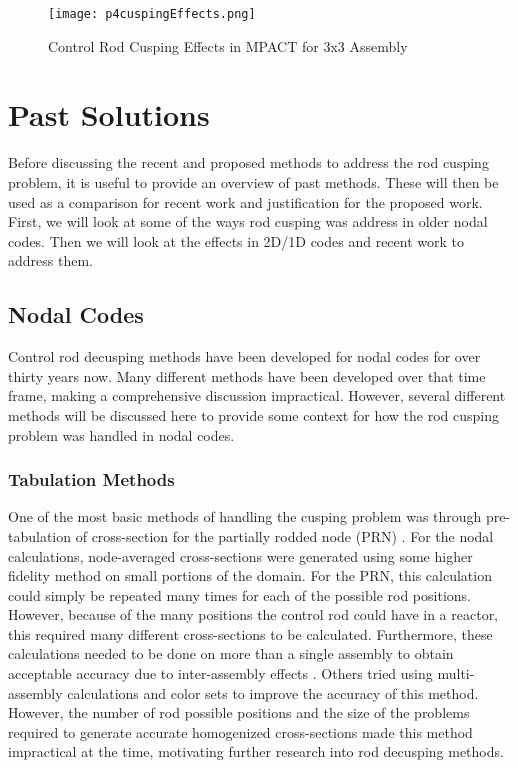 \begin{figure}
    \centering
    \texttt{[image: p4cuspingEffects.png]}
    \caption[Rod Cusping in MPACT]{Control Rod Cusping Effects in MPACT for 3x3 Assembly}\label{f:p4cuspingEffects}
\end{figure}

\section{Past Solutions}

Before discussing the recent and proposed methods to address the rod cusping problem, it is useful to provide an overview of past methods.  These will then be used as a comparison for recent work and justification for the proposed work.  First, we will look at some of the ways rod cusping was address in older nodal codes.  Then we will look at the effects in 2D/1D codes and recent work to address them.

\subsection{Nodal Codes}

Control rod decusping methods have been developed for nodal codes for over thirty years now.  Many different methods have been developed over that time frame, making a comprehensive discussion impractical.  However, several different methods will be discussed here to provide some context for how the rod cusping problem was handled in nodal codes.

\subsubsection{Tabulation Methods}

One of the most basic methods of handling the cusping problem was through pre-tabulation of cross-section for the partially rodded node (PRN) \cite{HanSemJooThesis1984}.  For the nodal calculations, node-averaged cross-sections were generated using some higher fidelity method on small portions of the domain.  For the PRN, this calculation could simply be repeated many times for each of the possible rod positions.  However, because of the many positions the control rod could have in a reactor, this required many different cross-sections to be calculated.  Furthermore, these calculations needed to be done on more than a single assembly to obtain acceptable accuracy due to inter-assembly effects \cite{KordSmithThesis1980spatial}.  Others tried using multi-assembly calculations \cite{hoxieThesis1982application} and color sets \cite{khalilThesis1983application} to improve the accuracy of this method.  However, the number of rod possible positions and the size of the problems required to generate accurate homogenized cross-sections made this method impractical at the time, motivating further research into rod decusping methods.

